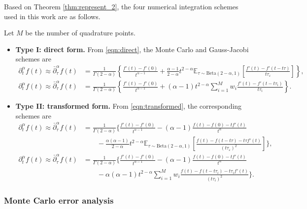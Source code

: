 \documentclass[preprint,3p,times]{elsarticle}
\def\al{\alpha}
\def\al{\alpha}
\def\dta{\partial_t^\alpha}
\def\btau{\bar\partial_\tau^\al}
\begin{document}
Based on Theorem \ref{thm:represent_2}, the four numerical integration schemes used in this work are as follows.
\begin{corollary}
\label{coro:4}
Let $M$ be the number of quadrature points.
\begin{itemize}
    \item \textbf{Type I: direct form.} From \eqref{eqn:direct}, the Monte Carlo and Gauss-Jacobi schemes are
    \begin{align}
        \label{eqn:I-MC}
        \dta f(t)\approx \btau f(t)
        &=\frac{1}{\Gamma(2-\alpha)}\left\{
        \frac{f'(t)-f'(0)}{t^{\alpha-1}}
        +\frac{\alpha-1}{2-\alpha}t^{2-\alpha}
        \mathbb E_{\tau\sim\mathrm{Beta}(2-\alpha,1)}\left[
        \frac{f'(t)-f'(t-t\tau)}{t\tau_\varepsilon}\right]\right\},\\
        \label{eqn:I-GJ}
        \dta f(t)\approx \btau f(t)
        &=\frac{1}{\Gamma(2-\alpha)}\left\{
        \frac{f'(t)-f'(0)}{t^{\alpha-1}}
        +(\alpha-1)t^{2-\alpha}\sum_{i=1}^Mw_i
        \frac{f'(t)-f'(t-t\tau_i)}{t\tau_i}\right\}.
    \end{align}
    \item \textbf{Type II: transformed form.} From \eqref{eqn:transformed}, the corresponding schemes are
    \begin{align}
        \label{eqn:II-MC}
        \dta f(t)\approx \btau f(t)
        &=\frac{1}{\Gamma(2-\alpha)}\Bigg\{
        \frac{f'(t)-f'(0)}{t^{\alpha-1}}
        -(\alpha-1)\frac{f(t)-f(0)-tf'(t)}{t^\alpha}\\
        &\qquad
        -\frac{\alpha(\alpha-1)}{2-\alpha}t^{2-\alpha}
        \mathbb E_{\tau\sim\mathrm{Beta}(2-\alpha,1)}\left[
        \frac{f(t)-f(t-t\tau)-t\tau f'(t)}{(t\tau_\varepsilon)^2}\right]\Bigg\},\nonumber\\
        \label{eqn:II-GJ}
        \dta f(t)\approx \btau f(t)
        &=\frac{1}{\Gamma(2-\alpha)}\Bigg\{
        \frac{f'(t)-f'(0)}{t^{\alpha-1}}
        -(\alpha-1)\frac{f(t)-f(0)-tf'(t)}{t^\alpha}\\
        &\qquad
        -\alpha(\alpha-1)t^{2-\alpha}\sum_{i=1}^Mw_i
        \frac{f(t)-f(t-t\tau_i)-t\tau_i f'(t)}{(t\tau_i)^2}\Bigg\}.\nonumber
    \end{align}
\end{itemize}
\end{corollary}

\subsubsection{Monte Carlo error analysis}
\end{document}

